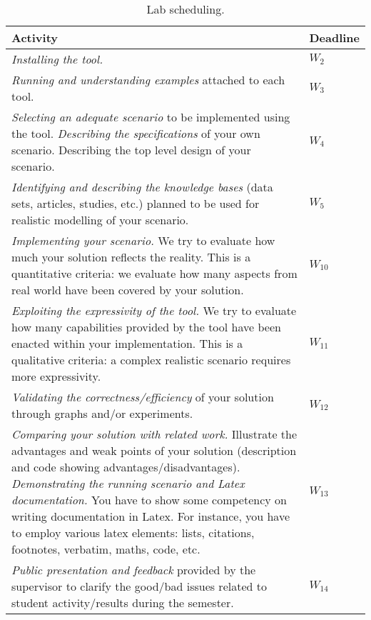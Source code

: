 \begin{table}
\begin{center}
\caption{Lab scheduling.}
\begin{tabular}{|p{11cm}|p{1.7cm}|}\hline
\textbf{Activity} & \textbf{Deadline}  \\ \hline
{\it Installing the tool.}  & $W_2$ \\ \hline
{\it Running and understanding examples} attached to each tool.& $W_3$  \\ \hline
{\it Selecting an adequate scenario} to be implemented using the tool. 
{\it Describing the specifications} of your own scenario. 
Describing the top level design of your scenario. & $W_4$  \\ \hline
{\it Identifying and describing the knowledge bases} (data sets, articles, studies, etc.) planned to be used for realistic modelling of your scenario. & $W_5$ \\ \hline
{\it Implementing your scenario.} We try to evaluate how much your solution reflects the reality. 
This is a quantitative criteria: 
we evaluate how many aspects from real world have been covered by your solution. & $W_{10}$ \\ \hline
{\it Exploiting the expressivity of the tool.} 
We try to evaluate how many capabilities provided by the tool have been enacted within your implementation. 
This is a qualitative criteria: a complex realistic scenario requires more expressivity. & $W_{11}$ \\ \hline
{\it Validating the correctness/efficiency} of your solution through graphs and/or experiments. & $W_{12}$  \\ \hline
{\it Comparing your solution with related work.} Illustrate the advantages and weak points of your solution (description and code showing advantages/disadvantages).  
{\it Demonstrating the running scenario and  Latex documentation.} You have to show some competency on writing documentation in Latex. 
For instance, you have to employ various latex elements: lists, citations, footnotes, verbatim, maths, code, etc. & $W_{13}$ \\ \hline
{\it Public presentation and feedback} provided by the supervisor to clarify the good/bad issues related to student activity/results during the semester. & $W_{14}$ \\ \hline 
\end{tabular}
\end{center}
\label{tab:first}
\end{table}

